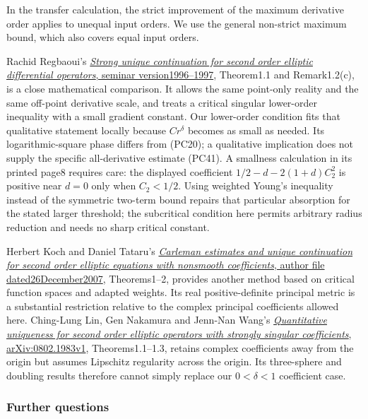 \documentclass[
  11pt,
]{article}
\begin{document}
In the transfer calculation, the strict improvement of the maximum
derivative order applies to unequal input orders. We use the general
non-strict maximum bound, which also covers equal input orders.

Rachid Regbaoui's
\href{https://www.numdam.org/item/SEDP_1996-1997____A3_0/}{\emph{Strong
unique continuation for second order elliptic differential operators},
seminar version1996--1997}, Theorem1.1 and Remark1.2(c), is a close
mathematical comparison. It allows the same point-only reality and the
same off-point derivative scale, and treats a critical singular
lower-order inequality with a small gradient constant. Our lower-order
condition fits that qualitative statement locally because \(Cr^\delta\)
becomes as small as needed. Its logarithmic-square phase differs from
(PC20); a qualitative implication does not supply the specific
all-derivative estimate (PC41). A smallness calculation in its printed
page8 requires care: the displayed coefficient \(1/2-d-2(1+d)C_2^2\) is
positive near \(d=0\) only when \(C_2<1/2\). Using weighted Young's
inequality instead of the symmetric two-term bound repairs that
particular absorption for the stated larger threshold; the subcritical
condition here permits arbitrary radius reduction and needs no sharp
critical constant.

Herbert Koch and Daniel Tataru's
\href{https://math.berkeley.edu/~tataru/papers/esucp3.pdf}{\emph{Carleman
estimates and unique continuation for second order elliptic equations
with nonsmooth coefficients}, author file dated26December2007},
Theorems1--2, provides another method based on critical function spaces
and adapted weights. Its real positive-definite principal metric is a
substantial restriction relative to the complex principal coefficients
allowed here. Ching-Lung Lin, Gen Nakamura and Jenn-Nan Wang's
\href{https://arxiv.org/abs/0802.1983v1}{\emph{Quantitative uniqueness
for second order elliptic operators with strongly singular
coefficients}, arXiv:0802.1983v1}, Theorems1.1--1.3, retains complex
coefficients away from the origin but assumes Lipschitz regularity
across the origin. Its three-sphere and doubling results therefore
cannot simply replace our \(0<\delta<1\) coefficient case.

\subsubsection{Further questions}\label{further-questions}
\end{document}
